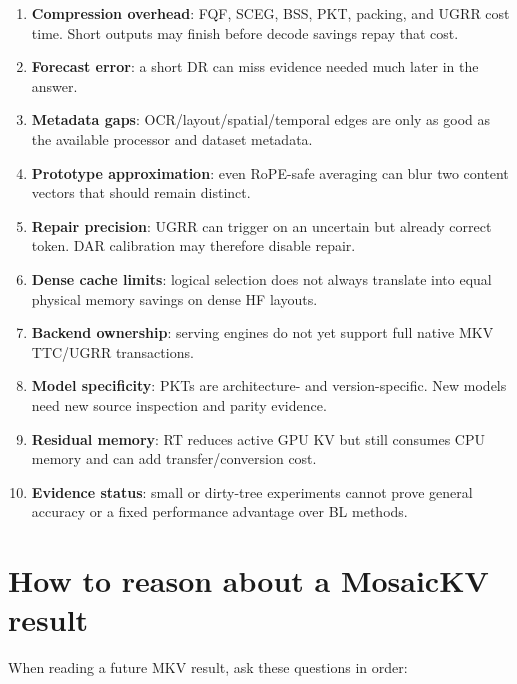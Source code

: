 \documentclass[11pt]{article}
\newcommand{\term}[1]{\textbf{#1}}
\begin{document}
\begin{enumerate}
  \item \term{Compression overhead}: FQF, SCEG, BSS, PKT, packing, and UGRR cost time. Short outputs
        may finish before decode savings repay that cost.
  \item \term{Forecast error}: a short DR can miss evidence needed much later in the answer.
  \item \term{Metadata gaps}: OCR/layout/spatial/temporal edges are only as good as the available
        processor and dataset metadata.
  \item \term{Prototype approximation}: even RoPE-safe averaging can blur two content vectors that
        should remain distinct.
  \item \term{Repair precision}: UGRR can trigger on an uncertain but already correct token. DAR
        calibration may therefore disable repair.
  \item \term{Dense cache limits}: logical selection does not always translate into equal physical
        memory savings on dense HF layouts.
  \item \term{Backend ownership}: serving engines do not yet support full native MKV TTC/UGRR
        transactions.
  \item \term{Model specificity}: PKTs are architecture- and version-specific. New models need new
        source inspection and parity evidence.
  \item \term{Residual memory}: RT reduces active GPU KV but still consumes CPU memory and can add
        transfer/conversion cost.
  \item \term{Evidence status}: small or dirty-tree experiments cannot prove general accuracy or a
        fixed performance advantage over BL methods.
\end{enumerate}

\section{How to reason about a MosaicKV result}
\label{sec:reading-results}

When reading a future MKV result, ask these questions in order:
\end{document}
